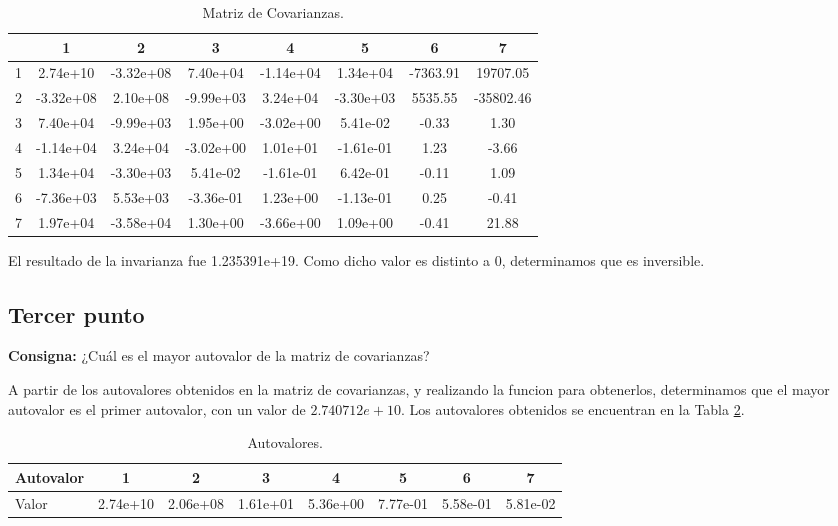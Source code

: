 \documentclass{article} %
\begin{document}
\begin{table}[H]
	\centering
		\begin{tabular}{||l || c | c | c | c | c | c | c ||}
			\hline
			\hline
			 & 1 & 2 & 3 & 4 & 5 & 6 & 7\\
			\hline			
			\hline
			1& 2.74e+10& -3.32e+08 & 7.40e+04 &-1.14e+04&      1.34e+04& -7363.91&      19707.05\\
			\hline
			2& -3.32e+08&  2.10e+08 &-9.99e+03 &3.24e+04&     -3.30e+03& 5535.55 &    -35802.46\\
			\hline
			3 &7.40e+04 &-9.99e+03  &1.95e+00 &-3.02e+00&      5.41e-02& -0.33   &       1.30\\
			\hline
			4 &-1.14e+04&  3.24e+04 &-3.02e+00& 1.01e+01&     -1.61e-01& 1.23    &     -3.66\\
			\hline
			5 &1.34e+04& -3.30e+03  &5.41e-02& -1.61e-01&      6.42e-01& -0.11   &       1.09\\
			\hline
			6 &-7.36e+03&  5.53e+03 &-3.36e-01& 1.23e+00&     -1.13e-01& 0.25    &     -0.41\\
			\hline
			7 &1.97e+04& -3.58e+04  &1.30e+00 &-3.66e+00&      1.09e+00& -0.41   &      21.88\\			
			\hline
			\hline
		\end{tabular}
		\caption{Matriz de Covarianzas.}
			\label{tab:table-punto-3-3}
\end{table}

El resultado de la invarianza fue 1.235391e+19. Como dicho valor es distinto a 0, determinamos que es inversible.

\subsection{Tercer punto}

\textbf{Consigna:} ¿Cuál es el mayor autovalor de la matriz de covarianzas?

A partir de los autovalores obtenidos en la matriz de covarianzas, y realizando la funcion para obtenerlos, determinamos que el mayor autovalor es el primer autovalor, con un valor de $2.740712e+10$. Los autovalores obtenidos se encuentran en la Tabla \ref{tab:table-punto-3-3-2}.

\begin{table}[H]
	\centering
		\begin{tabular}{||l || c | c | c | c | c | c | c ||}
			\hline
			\hline
			Autovalor & 1 & 2 & 3 & 4 & 5 & 6 & 7\\
			\hline			
			\hline
			Valor &  2.74e+10 & 2.06e+08 & 1.61e+01 & 5.36e+00 & 7.77e-01 & 5.58e-01 & 5.81e-02\\
			\hline
			\hline
		\end{tabular}
		\caption{Autovalores.}
		\label{tab:table-punto-3-3-2}
\end{table}
\end{document}
